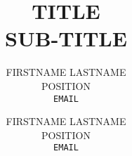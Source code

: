 \documentclass[a4paper,11pt]{article}
\begin{document}
	
\title{TITLE \\ SUB-TITLE}
\author{FIRSTNAME LASTNAME\\POSITION\\\texttt{\small EMAIL} \and FIRSTNAME LASTNAME\\POSITION\\\texttt{\small EMAIL}}
\maketitle

\tableofcontents
\listoffigures
\thispagestyle{empty}
\clearpage

\setcounter{page}{1}
\begin{multicols*}{2}
%
%
\end{multicols*}
\end{document}
